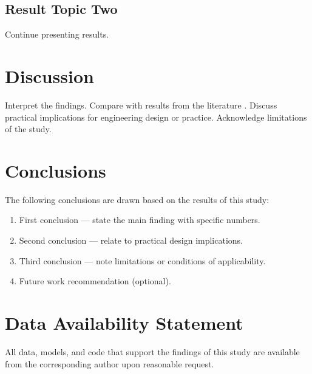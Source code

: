 \documentclass[12pt]{article}
\begin{document}
\subsection{Result Topic Two}
Continue presenting results.

\section{Discussion}

Interpret the findings.
Compare with results from the literature \citep{Author2020}.
Discuss practical implications for engineering design or practice.
Acknowledge limitations of the study.

\section{Conclusions}

The following conclusions are drawn based on the results of this study:
\begin{enumerate}
  \item First conclusion — state the main finding with specific numbers.
  \item Second conclusion — relate to practical design implications.
  \item Third conclusion — note limitations or conditions of applicability.
  \item Future work recommendation (optional).
\end{enumerate}

\section*{Data Availability Statement}
All data, models, and code that support the findings of this study are available
from the corresponding author upon reasonable request.
\end{document}
